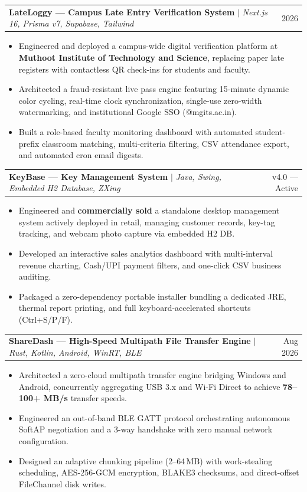 \documentclass[a4paper,10pt]{article}
\makeatletter
\newcommand{\resumeItem}[1]{
  \item\small{
    {#1 \vspace{-2pt}}
  }
}
\newcommand{\resumeProjectHeading}[2]{
    \item
    \begin{tabular*}{0.97\textwidth}{l@{\extracolsep{\fill}}r}
      \small#1 & #2 \\
    \end{tabular*}\vspace{-7pt}
}
\newcommand{\resumeItemListStart}{\begin{itemize}}
\newcommand{\resumeItemListEnd}{\end{itemize}\vspace{-5pt}}
\makeatother
\begin{document}
      \resumeProjectHeading
          {\textbf{LateLoggy --- Campus Late Entry Verification System} $|$ \emph{Next.js 16, Prisma v7, Supabase, Tailwind}}{2026}
          \resumeItemListStart
            \resumeItem{Engineered and deployed a campus-wide digital verification platform at \textbf{Muthoot Institute of Technology and Science}, replacing paper late registers with contactless QR check-ins for students and faculty.}
            \resumeItem{Architected a fraud-resistant live pass engine featuring 15-minute dynamic color cycling, real-time clock synchronization, single-use zero-width watermarking, and institutional Google SSO (@mgits.ac.in).}
            \resumeItem{Built a role-based faculty monitoring dashboard with automated student-prefix classroom matching, multi-criteria filtering, CSV attendance export, and automated cron email digests.}
          \resumeItemListEnd

      \resumeProjectHeading
          {\textbf{KeyBase --- Key Management System} $|$ \emph{Java, Swing, Embedded H2 Database, ZXing}}{v4.0 --- Active}
          \resumeItemListStart
            \resumeItem{Engineered and \textbf{commercially sold} a standalone desktop management system actively deployed in retail, managing customer records, key-tag tracking, and webcam photo capture via embedded H2 DB.}
            \resumeItem{Developed an interactive sales analytics dashboard with multi-interval revenue charting, Cash/UPI payment filters, and one-click CSV business auditing.}
            \resumeItem{Packaged a zero-dependency portable installer bundling a dedicated JRE, thermal report printing, and full keyboard-accelerated shortcuts (Ctrl+S/P/F).}
          \resumeItemListEnd

      \resumeProjectHeading
          {\textbf{ShareDash --- High-Speed Multipath File Transfer Engine} $|$ \emph{Rust, Kotlin, Android, WinRT, BLE}}{Aug 2026}
          \resumeItemListStart
            \resumeItem{Architected a zero-cloud multipath transfer engine bridging Windows and Android, concurrently aggregating USB 3.x and Wi-Fi Direct to achieve \textbf{78--100+ MB/s} transfer speeds.}
            \resumeItem{Engineered an out-of-band BLE GATT protocol orchestrating autonomous SoftAP negotiation and a 3-way handshake with zero manual network configuration.}
            \resumeItem{Designed an adaptive chunking pipeline (2--64\,MB) with work-stealing scheduling, AES-256-GCM encryption, BLAKE3 checksums, and direct-offset FileChannel disk writes.}
          \resumeItemListEnd
\end{document}

